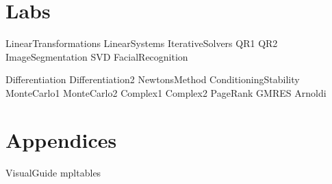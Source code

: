 \documentclass[nociteref]{SIAM-GH-book}
\begin{document}
\setcounter{tocdepth}{1}
\tableofcontents

\mainmatter %

\part{Labs} %
{LinearTransformations}
{LinearSystems}
{IterativeSolvers}
{QR1}
{QR2}
{ImageSegmentation}
{SVD}
{FacialRecognition}

{Differentiation}
{Differentiation2}
{NewtonsMethod}
{ConditioningStability}
{MonteCarlo1}
{MonteCarlo2}
{Complex1}
{Complex2}
{PageRank}
{GMRES}
{Arnoldi}

\part{Appendices} %
\begin{appendices}
{VisualGuide}
{mpltables}
\end{appendices}
\end{document}
